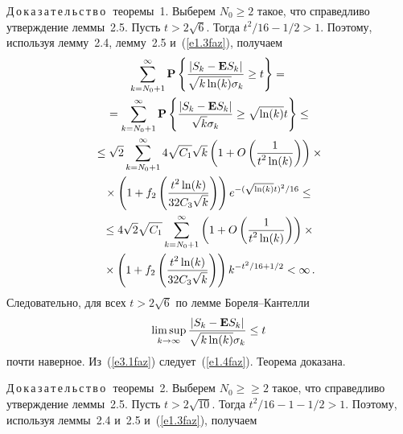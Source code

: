 \begin{multicols}{2}
\noindent
Д\,о\,к\,а\,з\,а\,т\,е\,л\,ь\,с\,т\,в\,о\,\ теоремы~1.  Выберем $N_0\ge 2$ такое, что
справедливо утверждение  леммы~2.5.
 Пусть $t>2\sqrt{6}$. Тогда
${t^2}/{16}-{1}/{2}>1$. Поэтому, используя лемму~2.4, лемму~2.5 и~(\ref{e1.3faz}), получаем
\begin{multline*}
 \sum_{k=N_0+1}^{\infty} {\bf P}\left\{\displaystyle\frac{\displaystyle |S_k-{{\bf E}}S_k|\mathstrut}{\displaystyle \sqrt{k\ln(k)}\sigma_k\mathstrut} \ge t\right\} ={}\\
 {}=\sum_{k=N_0+1}^{\infty}
{\bf P}\left\{\displaystyle\frac{\displaystyle |S_{k}-{{\bf E}}S_{k}|\mathstrut}{\displaystyle \sqrt{k}\sigma_k\mathstrut}\ge
\sqrt{\ln(k)}t\right\}\le{}
\\
{}\le\sqrt{2}\sum_{k=N_0+1}^{\infty}4\sqrt{C_1}\sqrt{k}\left(1+O\left(\displaystyle\frac{\displaystyle 1\mathstrut}{\displaystyle t^2\ln(k)\mathstrut}\right)
\right)\times{}\\
{}\times \left(1+f_2\left(\displaystyle\frac{\displaystyle t^2\ln(k)\mathstrut}{\displaystyle 32C_3
\sqrt{k}\mathstrut}\right)\right)e^{-{(\sqrt{\ln(k)}t)^2}/{16}}\le{}\\
{}
\le 4\sqrt{2}\sqrt{C_1}
\sum_{k=N_0+1}^{\infty}\left(1+O\left(\displaystyle\frac{\displaystyle 1\mathstrut}{\displaystyle t^2\ln(k)\mathstrut}\right)
\right)\times{}\\
{}\times
\left(1+f_2\left(\displaystyle\frac{\displaystyle t^2\ln(k)\mathstrut}{\displaystyle 32C_3\sqrt{k}\mathstrut}\right)\right)
k^{-t^2/16 +1/2}<\infty\,.
\end{multline*}
Следовательно, для всех $t>2\sqrt{6}$  по лемме Бореля--Кантелли
\begin{equation}
\limsup_{k\to\infty}\displaystyle\frac{\displaystyle |S_{k}-{{\bf E}}S_{k}|\mathstrut}{\displaystyle \sqrt{k\ln(k)}\sigma_k\mathstrut}\le t
\label{e3.1faz}
\end{equation} 
почти наверное. Из~(\ref{e3.1faz}) следует~(\ref{e1.4faz}). Теорема доказана.
%

\medskip

\noindent

Д\,о\,к\,а\,з\,а\,т\,е\,л\,ь\,с\,т\,в\,о\,\ теоремы~2. Выберем $N_0\ge$\linebreak $\ge 2$ такое, что
справедливо утверждение  леммы~2.5.
 Пусть $t>2\sqrt{10}$. Тогда
${t^2}/{16}-1-{1}/{2}>1$. Поэтому, используя  леммы~2.4 и~2.5 и~(\ref{e1.3faz}), получаем


\end{multicols}
